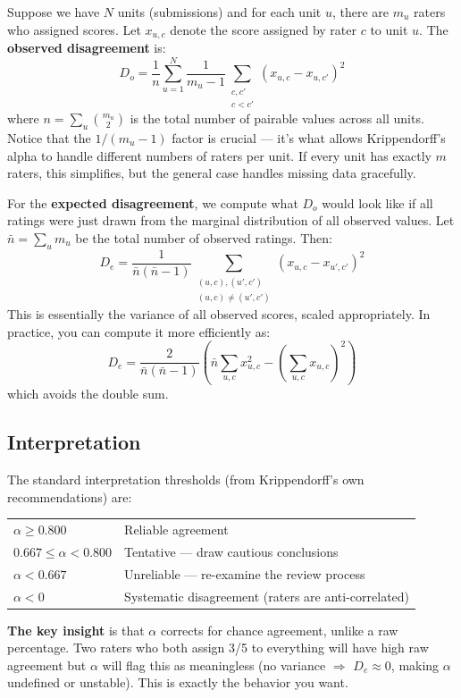\documentclass[11pt]{article}
\begin{document}
Suppose we have $N$ units (submissions) and for each unit $u$, there are $m_u$ raters who assigned scores. Let $x_{u,c}$ denote the score assigned by rater $c$ to unit $u$. The \textbf{observed disagreement} is:
\[
    D_o = \frac{1}{n} \sum_{u=1}^{N} \frac{1}{m_u - 1} \sum_{\substack{c, c' \\ c < c'}} (x_{u,c} - x_{u,c'})^2
\]
where $n = \sum_u \binom{m_u}{2}$ is the total number of pairable values across all units. Notice that the $1/(m_u - 1)$ factor is crucial --- it's what allows Krippendorff's alpha to handle different numbers of raters per unit. If every unit has exactly $m$ raters, this simplifies, but the general case handles missing data gracefully.

For the \textbf{expected disagreement}, we compute what $D_o$ would look like if all ratings were just drawn from the marginal distribution of all observed values. Let $\bar{n} = \sum_u m_u$ be the total number of observed ratings. Then:
\[
    D_e = \frac{1}{\bar{n}(\bar{n} - 1)} \sum_{\substack{(u,c), (u',c') \\ (u,c) \neq (u',c')}} (x_{u,c} - x_{u',c'})^2
\]
This is essentially the variance of all observed scores, scaled appropriately. In practice, you can compute it more efficiently as:
\[
    D_e = \frac{2}{\bar{n}(\bar{n}-1)} \left( \bar{n} \sum_{u,c} x_{u,c}^2 - \left(\sum_{u,c} x_{u,c}\right)^2 \right)
\]
which avoids the double sum.

\subsection{Interpretation}

The standard interpretation thresholds (from Krippendorff's own recommendations) are:

\begin{center}
\begin{tabular}{ll}
    $\alpha \geq 0.800$ & Reliable agreement \\
    $0.667 \leq \alpha < 0.800$ & Tentative --- draw cautious conclusions \\
    $\alpha < 0.667$ & Unreliable --- re-examine the review process \\
    $\alpha < 0$ & Systematic disagreement (raters are anti-correlated)
\end{tabular}
\end{center}

\textbf{The key insight} is that $\alpha$ corrects for chance agreement, unlike a raw percentage. Two raters who both assign 3/5 to everything will have high raw agreement but $\alpha$ will flag this as meaningless (no variance $\Rightarrow$ $D_e \approx 0$, making $\alpha$ undefined or unstable). This is exactly the behavior you want.
\end{document}
